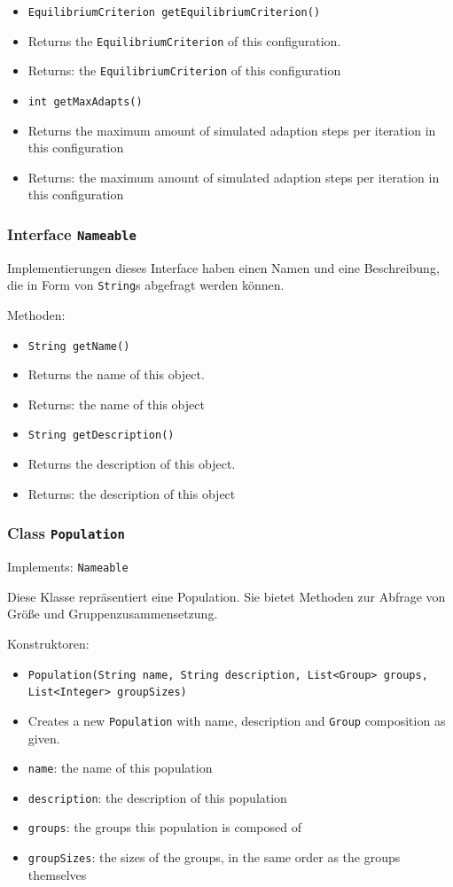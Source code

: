 \documentclass[parskip=full,11pt]{scrartcl}
\begin{document}
\begin{itemize}
\item \texttt{EquilibriumCriterion getEquilibriumCriterion()}
\item[] Returns the \texttt{EquilibriumCriterion} of this configuration.
\item[] Returns: the \texttt{EquilibriumCriterion} of this configuration

\item \texttt{int getMaxAdapts()}
\item[] Returns the maximum amount of simulated adaption steps per iteration in this configuration
\item[] Returns: the maximum amount of simulated adaption steps per iteration in this configuration
\end{itemize}

\subsubsection{Interface \texttt{Nameable}}

Implementierungen dieses Interface haben einen Namen und eine Beschreibung, die in Form von \texttt{String}s abgefragt werden können.

Methoden:
\begin{itemize}\itemsep -10pt
\item \texttt{String getName()}
\item[] Returns the name of this object.
\item[] Returns: the name of this object

\item \texttt{String getDescription()}
\item[] Returns the description of this object.
\item[] Returns: the description of this object
\end{itemize}

\subsubsection{Class \texttt{Population}}
Implements: \texttt{Nameable}

Diese Klasse repräsentiert eine Population. Sie bietet Methoden zur Abfrage von Größe und Gruppenzusammensetzung.

Konstruktoren:
\begin{itemize}\itemsep -10pt
\item \texttt{Population(String name, String description, List<Group> groups, List<Integer> groupSizes)}
\item[] Creates a new \texttt{Population} with name, description and \texttt{Group} composition as given.
\item[] \texttt{name}: the name of this population
\item[] \texttt{description}: the description of this population
\item[] \texttt{groups}: the groups this population is composed of
\item[] \texttt{groupSizes}: the sizes of the groups, in the same order as the groups themselves
\end{itemize}
\end{document}
